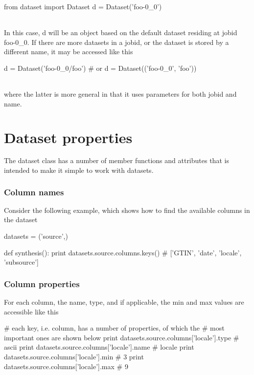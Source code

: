 \begin{python}
from dataset import Dataset
d = Dataset('foo-0_0')
\end{python}
\\
In this case, d will be an object based on the default dataset
residing at jobid foo-0\_0.  If there are more datasets in a jobid, or
the dataset is stored by a different name, it may be accessed like
this

\begin{python}
d = Dataset('foo-0_0/foo')
# or
d = Dataset(('foo-0_0', 'foo'))
\end{python}
\\
where the latter is more general in that it uses parameters for both
jobid and name.



\newpage
\section{Dataset properties}

The dataset class has a number of member functions and attributes that
is intended to make it simple to work with datasets.



\subsubsection{Column names}

Consider the
following example, which shows how to find the available columns in
the dataset

\begin{python}
datasets = ('source',)

def synthesis():
  print datasets.source.columns.keys()
  # ['GTIN', 'date', 'locale', 'subsource']
\end{python}



\subsubsection{Column properties}

For each column, the name, type, and if applicable, the min and max
values are accessible like this

\begin{python}
# each key, i.e. column, has a number of properties, of which the
# most important ones are shown below
print datasets.source.columns['locale'].type
# ascii
print datasets.source.columns['locale'].name
# locale
print datasets.source.columns['locale'].min
# 3
print datasets.source.columns['locale'].max
# 9
\end{python}

